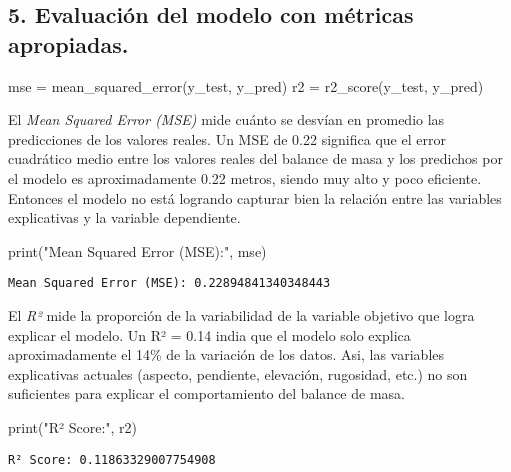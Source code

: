 \documentclass[
  letterpaper,
  DIV=11,
  numbers=noendperiod]{scrartcl}
\newenvironment{Shaded}{\begin{snugshade}}{\end{snugshade}}
\newcommand{\BuiltInTok}[1]{\textcolor[rgb]{0.00,0.23,0.31}{#1}}
\newcommand{\NormalTok}[1]{\textcolor[rgb]{0.00,0.23,0.31}{#1}}
\newcommand{\OperatorTok}[1]{\textcolor[rgb]{0.37,0.37,0.37}{#1}}
\newcommand{\StringTok}[1]{\textcolor[rgb]{0.13,0.47,0.30}{#1}}
\begin{document}
\subsection{5. Evaluación del modelo con métricas
apropiadas.}\label{evaluaciuxf3n-del-modelo-con-muxe9tricas-apropiadas.}

\begin{Shaded}
\begin{Highlighting}[]
\NormalTok{mse }\OperatorTok{=}\NormalTok{ mean\_squared\_error(y\_test, y\_pred)}
\NormalTok{r2 }\OperatorTok{=}\NormalTok{ r2\_score(y\_test, y\_pred)}
\end{Highlighting}
\end{Shaded}

El \emph{Mean Squared Error (MSE)} mide cuánto se desvían en promedio
las predicciones de los valores reales. Un MSE de 0.22 significa que el
error cuadrático medio entre los valores reales del balance de masa y
los predichos por el modelo es aproximadamente 0.22 metros, siendo muy
alto y poco eficiente. Entonces el modelo no está logrando capturar bien
la relación entre las variables explicativas y la variable dependiente.

\begin{Shaded}
\begin{Highlighting}[]
\BuiltInTok{print}\NormalTok{(}\StringTok{"Mean Squared Error (MSE):"}\NormalTok{, mse)}
\end{Highlighting}
\end{Shaded}

\begin{verbatim}
Mean Squared Error (MSE): 0.22894841340348443
\end{verbatim}

El \emph{R²} mide la proporción de la variabilidad de la variable
objetivo que logra explicar el modelo. Un R² = 0.14 india que el modelo
solo explica aproximadamente el 14\% de la variación de los datos. Asi,
las variables explicativas actuales (aspecto, pendiente, elevación,
rugosidad, etc.) no son suficientes para explicar el comportamiento del
balance de masa.

\begin{Shaded}
\begin{Highlighting}[]
\BuiltInTok{print}\NormalTok{(}\StringTok{"R² Score:"}\NormalTok{, r2)}
\end{Highlighting}
\end{Shaded}

\begin{verbatim}
R² Score: 0.11863329007754908
\end{verbatim}
\end{document}
